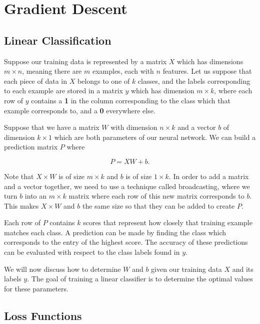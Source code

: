 \newpage
\section{Gradient Descent}\label{ch:gradient_descent} 


\subsection{Linear Classification}

Suppose our training data is represented by a matrix $X$ which has dimensions
$m \times n$, meaning there are $m$ examples, each with $n$ features. Let us
suppose that each piece of data in $X$ belongs to one of $k$ classes, and the
labels corresponding to each example are stored in a matrix $y$ which has
dimension $m \times k$, where each row of $y$ contains a \textbf{1} in the column
corresponding to the class which that example corresponds to, and a \textbf{0}
everywhere else.

Suppose that we have a matrix $W$ with dimension $n \times k$ and a vector $b$
of dimension $k \times 1$ which are both parameters of our neural network. We
can build a prediction matrix $P$ where

\[
P = XW + b.
\]

Note that $X \times W$ is of size $m \times k$ and $b$ is of size $1 \times k$.
In order to add a matrix and a vector together, we need to use a technique
called broadcasting, where we turn $b$ into an $m \times k$ matrix where each
row of this new matrix corresponds to $b$. This makes $X \times W$ and $b$ the
same size so that they can be added to create $P$.

Each row of $P$ contains $k$ scores that represent how closely that
training example matches each class. A prediction can be made by finding the
class which corresponds to the entry of the highest score. The accuracy of
these predictions can be evaluated with respect to the class labels found in
$y$.

We will now discuss how to determine $W$ and $b$ given our training data $X$
and its labels $y$. The goal of training a linear classifier is to determine
the optimal values for these parameters.

\subsection{Loss Functions}

